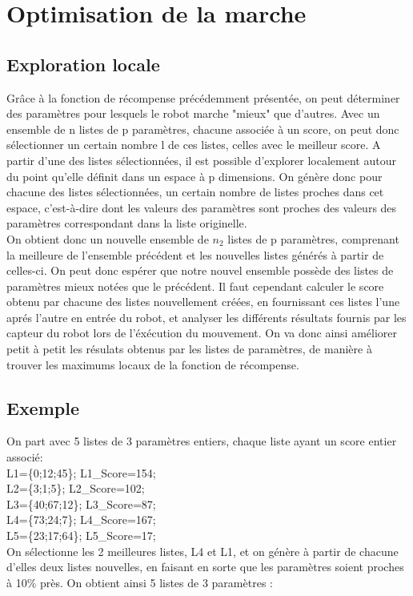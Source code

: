 \documentclass[11pt]{article}
\begin{document}
\section{Optimisation de la marche}
\subsection{Exploration locale}
Grâce à la fonction de récompense précédemment présentée, on peut déterminer des paramètres pour lesquels le robot marche "mieux" que d'autres. Avec un ensemble de n listes de p paramètres, chacune associée à un score, on peut donc sélectionner un certain nombre l de ces listes, celles avec le  meilleur score. A partir d'une des listes sélectionnées, il est possible d'explorer localement autour du point qu'elle définit dans un espace à p dimensions. On génère donc pour chacune des listes sélectionnées, un certain nombre de listes proches dans cet espace, c'est-à-dire dont les valeurs des paramètres sont proches des valeurs des paramètres correspondant dans la liste originelle.\\
On obtient donc un nouvelle ensemble de $n_2$ listes de p paramètres, comprenant la meilleure de l'ensemble précédent et les nouvelles listes générés à partir de celles-ci. On peut donc espérer que notre nouvel ensemble possède des listes de paramètres mieux notées que le précédent. Il faut cependant calculer le score obtenu par chacune des listes nouvellement créées, en fournissant ces listes l'une aprés l'autre en entrée du robot, et analyser les différents résultats fournis par les capteur du robot lors de l'éxécution du mouvement. On va donc ainsi améliorer petit à petit les résulats obtenus par les listes de paramètres, de manière à trouver les maximums locaux de la fonction de récompense.

\subsection*{Exemple} 
On part avec 5 listes de 3 paramètres entiers, chaque liste ayant un score entier associé:\\
L1=\{0;12;45\}; L1\_Score=154;\\
L2=\{3;1;5\}; L2\_Score=102;\\
L3=\{40;67;12\}; 
L3\_Score=87;\\
L4=\{73;24;7\};  
L4\_Score=167;\\
L5=\{23;17;64\}; 
L5\_Score=17;\\

On sélectionne les 2 meilleures listes, L4 et L1, et on génère à partir de chacune d'elles deux listes nouvelles, en faisant en sorte que les paramètres soient proches à 10\% près. On obtient ainsi 5 listes de 3 paramètres :\\
\end{document}
